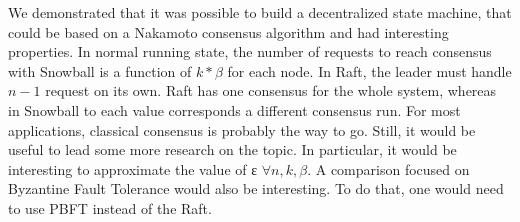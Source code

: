 \documentclass[11pt, twocolumn]{article}
\begin{document}
We demonstrated that it was possible to build a decentralized state machine, that could be based on a Nakamoto consensus algorithm and had interesting properties.
In normal running state, the number of requests to reach consensus with Snowball is a function of $k * \beta$ for each node. In Raft, the leader must handle $n-1$ request on its own.
Raft has one consensus for the whole system, whereas in Snowball to each value corresponds a different consensus run. For most applications, classical consensus is probably the way to go. Still, it would be useful to lead some more research on the topic.
In particular, it would be interesting to approximate the value of ε $\forall n, k, \beta$.
A comparison focused on Byzantine Fault Tolerance would also be interesting. To do that, one would need to use PBFT \cite{pbft} instead of the Raft.

\onecolumn
\end{document}
